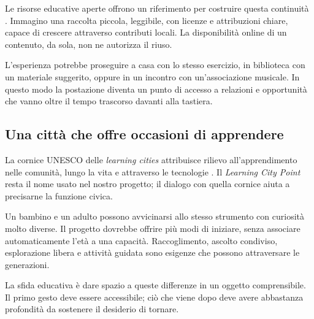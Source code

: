 Le risorse educative aperte offrono un riferimento per costruire
questa continuità \cite{unesco_oer2019}. Immagino una raccolta
piccola, leggibile, con licenze e attribuzioni chiare, capace
di crescere attraverso contributi locali. La disponibilità
online di un contenuto, da sola, non ne autorizza il riuso.

L'esperienza potrebbe proseguire a casa con lo stesso esercizio,
in biblioteca con un materiale suggerito, oppure in un incontro
con un'associazione musicale. In questo modo la postazione
diventa un punto di accesso a relazioni e opportunità che
vanno oltre il tempo trascorso davanti alla tastiera.

\subsection{Una città che offre occasioni di apprendere}
La cornice UNESCO delle \emph{learning cities} attribuisce
rilievo all'apprendimento nelle comunità, lungo la vita e
attraverso le tecnologie \cite{unesco_learning_cities}.
Il \emph{Learning City Point} resta il nome usato nel nostro
progetto; il dialogo con quella cornice aiuta a precisarne
la funzione civica.

Un bambino e un adulto possono avvicinarsi allo stesso
strumento con curiosità molto diverse. Il progetto dovrebbe
offrire più modi di iniziare, senza associare automaticamente
l'età a una capacità. Raccoglimento, ascolto condiviso,
esplorazione libera e attività guidata sono esigenze che
possono attraversare le generazioni.

La sfida educativa è dare spazio a queste differenze in
un oggetto comprensibile. Il primo gesto deve essere
accessibile; ciò che viene dopo deve avere abbastanza
profondità da sostenere il desiderio di tornare.

